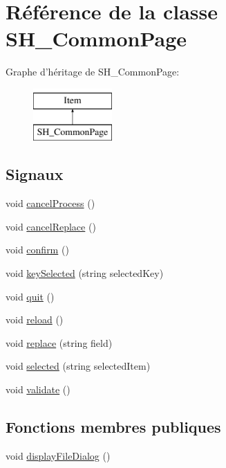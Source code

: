 \hypertarget{classSH__CommonPage}{\section{Référence de la classe S\-H\-\_\-\-Common\-Page}
\label{classSH__CommonPage}
}
Graphe d'héritage de S\-H\-\_\-\-Common\-Page\-:\begin{figure}[H]
\begin{center}
\leavevmode
\includegraphics[height=2.000000cm]{classSH__CommonPage}
\end{center}
\end{figure}
\subsection*{Signaux}
\begin{DoxyCompactItemize}
\item 
void \hyperlink{classSH__CommonPage_a500427619a33ea991ed173fa0ac3b446}{cancel\-Process} ()
\item 
void \hyperlink{classSH__CommonPage_a5b55fbe80e82ad1a7f06099680ba6595}{cancel\-Replace} ()
\item 
void \hyperlink{classSH__CommonPage_a66387106e42e843b3fd3ffbbcabbb8eb}{confirm} ()
\item 
void \hyperlink{classSH__CommonPage_a073e1151c7ac1c198931d77803d915d3}{key\-Selected} (string selected\-Key)
\item 
void \hyperlink{classSH__CommonPage_a5b15093af63a454ca459407ba1283038}{quit} ()
\item 
void \hyperlink{classSH__CommonPage_a548ff64a01793866cbef6485d1b23f7e}{reload} ()
\item 
void \hyperlink{classSH__CommonPage_a85adde41bfb4344268795d02a27c2e0c}{replace} (string field)
\item 
void \hyperlink{classSH__CommonPage_ab5af66b64fe452dc4e92e97f327ffba5}{selected} (string selected\-Item)
\item 
void \hyperlink{classSH__CommonPage_ad2a5e33acc0a2f0662d342ef44208cca}{validate} ()
\end{DoxyCompactItemize}
\subsection*{Fonctions membres publiques}
\begin{DoxyCompactItemize}
\item 
void \hyperlink{classSH__CommonPage_a4a067bd704f5c91d1487a8cb62f7f7b6}{display\-File\-Dialog} ()
\end{DoxyCompactItemize}
